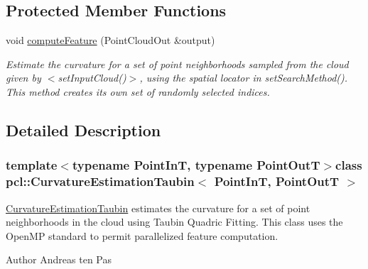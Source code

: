 \subsection*{\-Protected \-Member \-Functions}
\begin{DoxyCompactItemize}
\item 
void \hyperlink{classpcl_1_1_curvature_estimation_taubin_a0047de9c4098619563f334c666ae54c1}{compute\-Feature} (\-Point\-Cloud\-Out \&output)
\begin{DoxyCompactList}\small\item\em \-Estimate the curvature for a set of point neighborhoods sampled from the cloud given by $<$set\-Input\-Cloud()$>$, using the spatial locator in set\-Search\-Method(). \-This method creates its own set of randomly selected indices. \end{DoxyCompactList}\end{DoxyCompactItemize}


\subsection{\-Detailed \-Description}
\subsubsection*{template$<$typename Point\-In\-T, typename Point\-Out\-T$>$class pcl\-::\-Curvature\-Estimation\-Taubin$<$ Point\-In\-T, Point\-Out\-T $>$}

\hyperlink{classpcl_1_1_curvature_estimation_taubin}{\-Curvature\-Estimation\-Taubin} estimates the curvature for a set of point neighborhoods in the cloud using \-Taubin \-Quadric \-Fitting. \-This class uses the \-Open\-M\-P standard to permit parallelized feature computation. 

\begin{DoxyAuthor}{\-Author}
\-Andreas ten \-Pas 
\end{DoxyAuthor}


